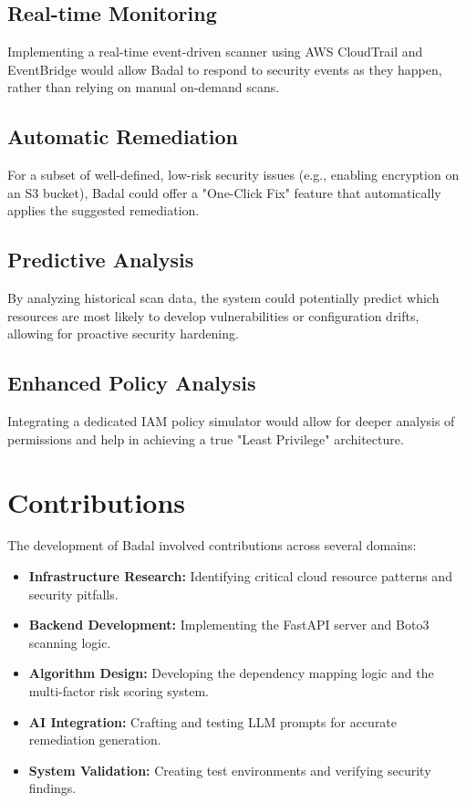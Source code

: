 \subsection{Real-time Monitoring}
Implementing a real-time event-driven scanner using AWS CloudTrail and EventBridge would allow Badal to respond to security events as they happen, rather than relying on manual on-demand scans.

\subsection{Automatic Remediation}
For a subset of well-defined, low-risk security issues (e.g., enabling encryption on an S3 bucket), Badal could offer a "One-Click Fix" feature that automatically applies the suggested remediation.

\subsection{Predictive Analysis}
By analyzing historical scan data, the system could potentially predict which resources are most likely to develop vulnerabilities or configuration drifts, allowing for proactive security hardening.

\subsection{Enhanced Policy Analysis}
Integrating a dedicated IAM policy simulator would allow for deeper analysis of permissions and help in achieving a true "Least Privilege" architecture.

\section*{Contributions}
The development of Badal involved contributions across several domains:
\begin{itemize}
    \item \textbf{Infrastructure Research:} Identifying critical cloud resource patterns and security pitfalls.
    \item \textbf{Backend Development:} Implementing the FastAPI server and Boto3 scanning logic.
    \item \textbf{Algorithm Design:} Developing the dependency mapping logic and the multi-factor risk scoring system.
    \item \textbf{AI Integration:} Crafting and testing LLM prompts for accurate remediation generation.
    \item \textbf{System Validation:} Creating test environments and verifying security findings.
\end{itemize}
